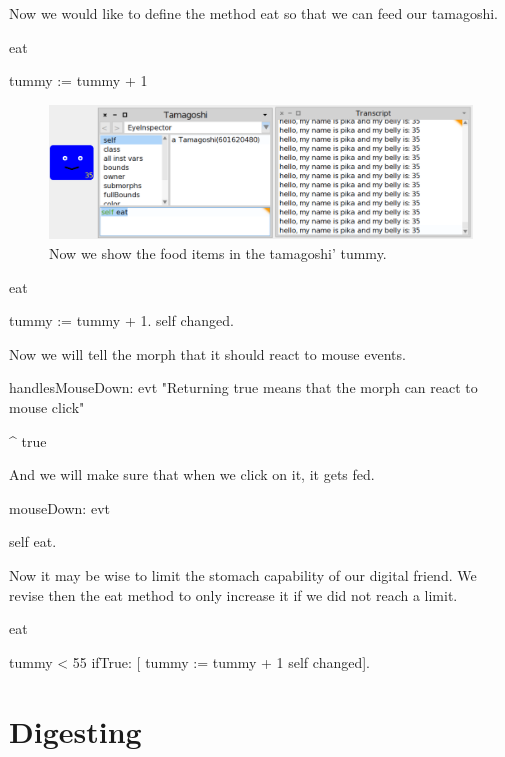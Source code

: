 \documentclass[a4paper,10pt,twoside]{book}
\begin{document}
Now we would like to define the method eat so that we can feed our tamagoshi.



\begin{code}{}
eat 

	tummy := tummy + 1
\end{code}


\begin{figure}
\begin{center}
\includegraphics[width=12cm]{figures/eating}
\caption{Now we show the food items in the tamagoshi' tummy.\label{withbtummy}}
\end{center}
\end{figure}


\begin{code}{}
eat 

	tummy := tummy + 1.
	self changed.
\end{code}


Now we will tell the morph that it should react to mouse events.
\begin{code}{}
handlesMouseDown: evt
	"Returning true means that the morph can react to mouse click"

	^ true
\end{code}

And we will make sure that when we click on it, it gets fed.
\begin{code}{}
mouseDown: evt
	
	self eat.	
\end{code}

Now it may be wise to limit the stomach capability of our digital friend. We revise then the eat method to only increase it if we did not reach a limit. 

\begin{code}{}
eat 

	tummy < 55
		ifTrue: [ tummy := tummy + 1
				  self changed]. 
\end{code}

\section{Digesting}
\end{document}
